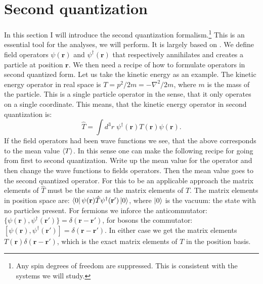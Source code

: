 \section{Second quantization} \label{sec.secondquantization}
In this section I will introduce the second quantization formalism.\footnote{Any spin degrees of freedom are suppressed. This is consistent with the systems we will study.} This is an essential tool for the analyses, we will perform. It is largely based on \cite[pp. 221-227]{LandauQM}. We define field operators $\psi(\mathbf{r})$ and $\psi^\dagger(\mathbf{r})$ that respectively annihilates and creates a particle at position $\mathbf{r}$. We then need a recipe of how to formulate operators in second quantized form. Let us take the kinetic energy as an example. The kinetic energy operator in real space is $T = p^2/2m = -\nabla^2/2m$, where $m$ is the mass of the particle. This is a single particle operator in the sense, that it only operates on a single coordinate. This means, that the kinetic energy operator in second quantization is:
\begin{equation}
\hat{T} = \int d^3 r \; \psi^\dagger(\mathbf{r}) T(\mathbf{r})\psi(\mathbf{r}). \nonumber   
\end{equation} 
If the field operators had been wave functions we see, that the above corresponds to the mean value $\braket{T}$. In this sense one can make the following recipe for going from first to second quantization. Write up the mean value for the operator and then change the wave functions to fields operators. Then the mean value goes to the second quantized operator. For this to be an applicable approach the matrix elements of $\hat{T}$ must be the same as the matrix elements of $T$. The matrix elements in position space are: $\bra{0}\psi(\mathbf{r}) \hat{T} \psi^\dagger(\mathbf{r}')\ket{0}$, where $\ket{0}$ is the vacuum: the state with no particles present. For fermions we inforce the anticommutator: $\{\psi(\mathbf{r}), \psi^\dagger(\mathbf{r}')\} = \delta(\mathbf{r}-\mathbf{r}')$, for bosons the commutator: $[\psi(\mathbf{r}), \psi^\dagger(\mathbf{r}')] = \delta(\mathbf{r}-\mathbf{r}')$. In either case we get the matrix elements $T(\mathbf{r})\delta(\mathbf{r}-\mathbf{r}')$, which is the exact matrix elements of $T$ in the position basis. 

